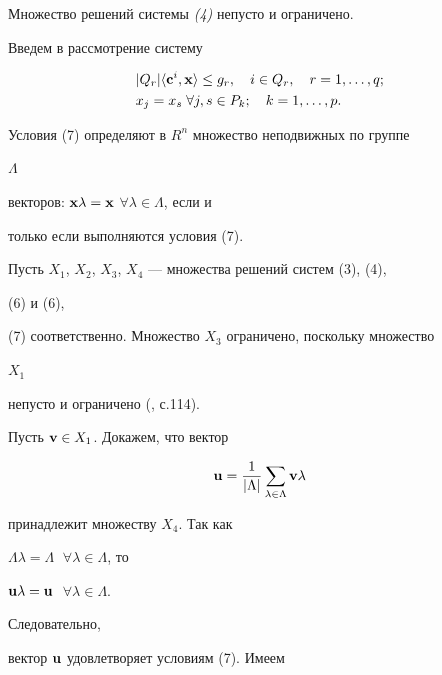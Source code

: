 \begin{lem}


Множество решений системы {\em (4)} непусто и ограничено.


\end{lem}





\begin{pf}


Введем в рассмотрение систему


\begin{align}


&|Q_r|\la\bold c^i,\bold x\ra\le g_r,\quad i\in Q_r,\quad


r=1,\dotsc,q;\\


&x_j=x_s \; \forall j,s\in P_k;\quad k=1,\dotsc,p.


\end{align}


Условия (7) определяют в $R^n$ множество неподвижных по группе


$\Lambda$


векторов: $\bold x\lambda=\bold x$ $\forall\lambda\in\Lambda$, если и


только если выполняются условия (7).





Пусть $X_1$, $X_2$, $X_3$, $X_4$ --- множества решений систем (3), (4),


(6) и (6),


(7) соответственно. Множество $X_3$ ограничено, поскольку множество


$X_1$


непусто и ограничено (\cite{Er}, с.114).





Пусть $\bold v\in X_1$. Докажем, что вектор


$$


\bold u=\frac{1}{|\Lambda|}\sum_{\lambda\in\Lambda}\bold v\lambda


$$


принадлежит множеству $X_4$. Так как


$\Lambda\lambda=\Lambda$ $\;\forall\lambda\in\Lambda$, то


$\bold u\lambda=\bold u$ $\;\forall\lambda\in\Lambda$.


Следовательно,


вектор $\bold u$ удовлетворяет условиям (7). Имеем



\end{pf}
